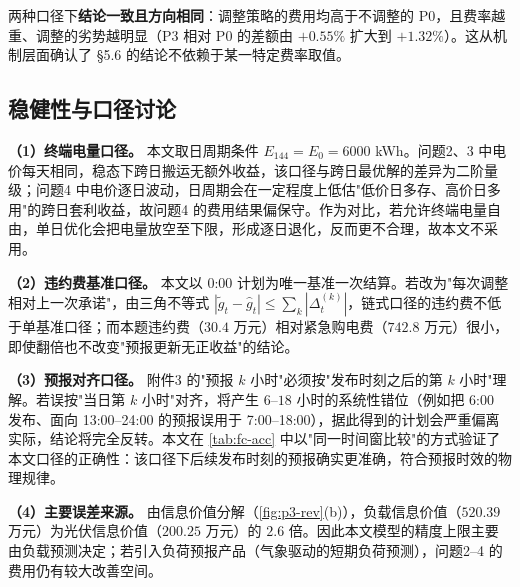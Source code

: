两种口径下\textbf{结论一致且方向相同}：调整策略的费用均高于不调整的 P0，且费率越重、调整的劣势越明显（P3 相对 P0 的差额由 $+0.55\%$ 扩大到 $+1.32\%$）。这从机制层面确认了 \S5.6 的结论不依赖于某一特定费率取值。

\subsection{稳健性与口径讨论}

\textbf{（1）终端电量口径。} 本文取日周期条件 $E_{144}=E_0=6000$ \si{kWh}。问题2、3 中电价每天相同，稳态下跨日搬运无额外收益，该口径与跨日最优解的差异为二阶量级；问题4 中电价逐日波动，日周期会在一定程度上低估"低价日多存、高价日多用"的跨日套利收益，故问题4 的费用结果偏保守。作为对比，若允许终端电量自由，单日优化会把电量放空至下限，形成逐日退化，反而更不合理，故本文不采用。

\textbf{（2）违约费基准口径。} 本文以 0:00 计划为唯一基准一次结算。若改为"每次调整相对上一次承诺"，由三角不等式 $|\tilde g_t-\hat g_t|\le\sum_k|\Delta_t^{(k)}|$，链式口径的违约费不低于单基准口径；而本题违约费（$30.4$ 万元）相对紧急购电费（$742.8$ 万元）很小，即使翻倍也不改变"预报更新无正收益"的结论。

\textbf{（3）预报对齐口径。} 附件3 的"预报 $k$ 小时"必须按"发布时刻之后的第 $k$ 小时"理解。若误按"当日第 $k$ 小时"对齐，将产生 $6$--$18$ 小时的系统性错位（例如把 6:00 发布、面向 13:00--24:00 的预报误用于 7:00--18:00），据此得到的计划会严重偏离实际，结论将完全反转。本文在 \cref{tab:fc-acc} 中以"同一时间窗比较"的方式验证了本文口径的正确性：该口径下后续发布时刻的预报确实更准确，符合预报时效的物理规律。

\textbf{（4）主要误差来源。} 由信息价值分解（\cref{fig:p3-rev}(b)），负载信息价值（$520.39$ 万元）为光伏信息价值（$200.25$ 万元）的 $2.6$ 倍。因此本文模型的精度上限主要由负载预测决定；若引入负荷预报产品（气象驱动的短期负荷预测），问题2--4 的费用仍有较大改善空间。
